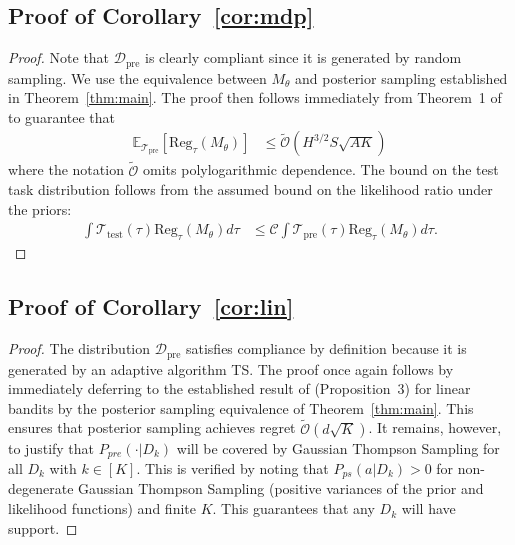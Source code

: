 \documentclass{article}
\newcommand{\Ccal}{\mathcal{C}}
\newcommand{\Dcal}{\mathcal{D}}
\newcommand{\Ocal}{\mathcal{O}}
\newcommand{\Tcal}{{\mathcal{T}}}
\newcommand{\E}{\mathbb{E}}
\newcommand{\pretraind}{\Dcal_{\text{pre}}}
\newcommand{\pretraint}{\Tcal_{\text{pre}}}
\newcommand{\testt}{\Tcal_{\text{test}}}
\newcommand{\regret}{\text{Reg}}
\begin{document}
\subsection{Proof of Corollary~\ref{cor:mdp}}
\cormdp*
\begin{proof} Note that $\pretraind$ is clearly compliant since it is generated by random sampling.
We use the equivalence between $M_{\theta}$ and posterior sampling established in Theorem~\ref{thm:main}.
The proof then follows immediately from Theorem~1 of \cite{osband2013more} to guarantee that
\begin{align}
    \E_{\pretraint} \left[ \regret_\tau(M_{\theta})\right] & \leq \widetilde{\Ocal} \left(H^{3/2}S\sqrt{A K}\right)
\end{align}
where the notation $\widetilde{\Ocal}$ omits polylogarithmic dependence. The bound on the test task distribution follows from the assumed bound on the likelihood ratio under the priors:
\begin{align}
     \int \testt(\tau) \regret_\tau(M_{\theta})  d\tau  & \leq  \Ccal \int \pretraint(\tau) \regret_\tau(M_{\theta})  d\tau.
\end{align}
\end{proof}
\subsection{Proof of Corollary~\ref{cor:lin}}
\corlin*
\begin{proof}
    The distribution $\pretraind$ satisfies compliance by definition because it is generated by an adaptive algorithm TS.
    The proof once again follows by immediately deferring  to the established result of \cite{russo2014learning} (Proposition~3) for linear bandits by the posterior sampling equivalence of Theorem~\ref{thm:main}. This ensures that posterior sampling achieves regret $\widetilde{\Ocal}(d\sqrt{K})$. It remains, however, to justify that $P_{pre}(\cdot | D_k)$ will be covered by Gaussian Thompson Sampling for all $D_k$ with $k \in [K]$. This is verified by noting that $P_{ps}(a | D_k) > 0$ for non-degenerate Gaussian Thompson Sampling (positive variances of the prior and likelihood functions) and finite $K$. This guarantees that any $D_k$ will have support.
\end{proof}
\end{document}
